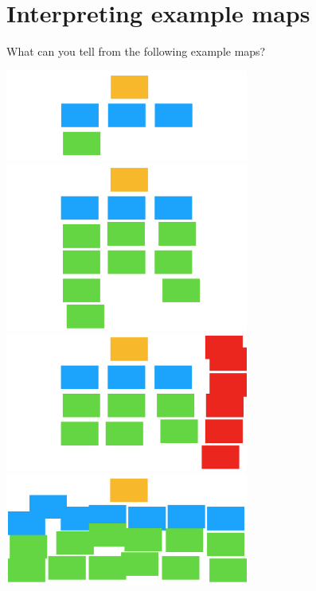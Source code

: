 \chapter*{Interpreting example maps}

\ifnotes

\fi

\ifcontent

    What can you tell from the following example maps?
    
    \begin{center}
        \includegraphics[width=0.6\textwidth, keepaspectratio]{images/example-map-1}
        \includegraphics[width=0.6\textwidth, keepaspectratio]{images/example-map-2}
        \includegraphics[width=0.6\textwidth, keepaspectratio]{images/example-map-3}
        \includegraphics[width=0.6\textwidth, keepaspectratio]{images/example-map-4}
    \end{center}
\fi